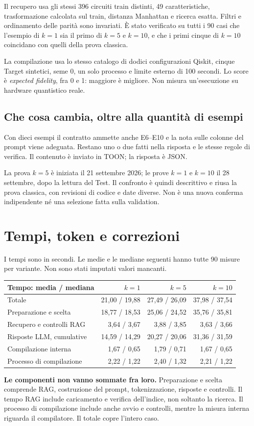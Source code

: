\documentclass[a4paper,10pt]{article}
\begin{document}
Il recupero usa gli stessi 396 circuiti train distinti, 49 caratteristiche,
trasformazione calcolata sul train, distanza Manhattan e ricerca esatta.
Filtri e ordinamento delle parità sono invariati. È stato verificato su tutti
i 90 casi che l'esempio di $k=1$ sia il primo di $k=5$ e $k=10$, e che i primi
cinque di $k=10$ coincidano con quelli della prova classica.

La compilazione usa lo stesso catalogo di dodici configurazioni Qiskit,
cinque Target sintetici, seme 0, un solo processo e limite esterno di 100 secondi.
Lo score è \emph{expected fidelity}, fra 0 e 1: maggiore è migliore.
Non misura un'esecuzione su hardware quantistico reale.

\subsection{Che cosa cambia, oltre alla quantità di esempi}
Con dieci esempi il contratto ammette anche E6--E10 e la nota sulle colonne del
prompt viene adeguata. Restano uno o due fatti nella risposta e le stesse regole
di verifica. Il contenuto è inviato in TOON; la risposta è JSON.

La prova $k=5$ è iniziata il 21 settembre 2026; le prove $k=1$ e $k=10$ il
28 settembre, dopo la lettura del Test. Il confronto è quindi descrittivo e
riusa la prova classica, con revisioni di codice e date diverse. Non è una
nuova conferma indipendente né una selezione fatta sulla validation.

\clearpage\section{Tempi, token e correzioni}
I tempi sono in secondi. Le medie e le mediane seguenti hanno tutte
90 misure per variante. Non sono stati imputati valori mancanti.\par\begingroup\small\renewcommand{\arraystretch}{1.18}\setlength{\tabcolsep}{5pt}
\begin{tabularx}{\linewidth}{Xrrr}\toprule
Tempo: media / mediana & $k=1$ & $k=5$ & $k=10$\\\midrule
Totale & 21,00 / 19,88 & 27,49 / 26,09 & 37,98 / 37,54\\
Preparazione e scelta & 18,77 / 18,53 & 25,06 / 24,52 & 35,76 / 35,81\\
Recupero e controlli RAG & 3,64 / 3,67 & 3,88 / 3,85 & 3,63 / 3,66\\
Risposte LLM, cumulative & 14,59 / 14,29 & 20,27 / 20,06 & 31,36 / 31,59\\
Compilazione interna & 1,67 / 0,65 & 1,79 / 0,71 & 1,67 / 0,65\\
Processo di compilazione & 2,22 / 1,22 & 2,40 / 1,32 & 2,21 / 1,22\\
\bottomrule\end{tabularx}\endgroup\par
\textbf{Le componenti non vanno sommate fra loro.} Preparazione e scelta
comprende RAG, costruzione del prompt, tokenizzazione, risposte e controlli.
Il tempo RAG include caricamento e verifica dell'indice, non soltanto la ricerca.
Il processo di compilazione include anche avvio e controlli, mentre la misura
interna riguarda il compilatore. Il totale copre l'intero caso.\par
\end{document}
